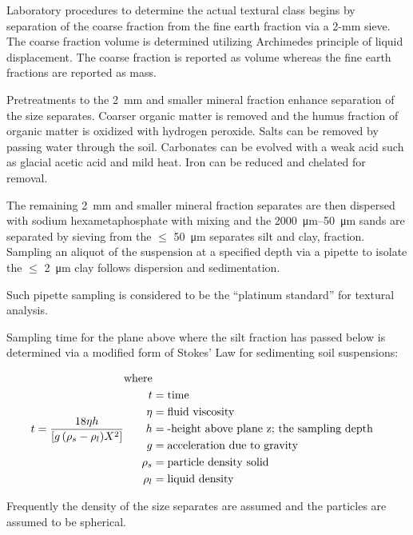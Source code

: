 \documentclass{article}
\begin{document}
Laboratory procedures to determine the actual textural class begins by separation of the coarse fraction from the fine earth fraction via a 2-mm sieve. The coarse fraction volume is determined utilizing Archimedes principle of liquid displacement. The coarse fraction is reported as volume whereas the fine earth fractions are reported as mass.

Pretreatments to the 2~mm and smaller mineral fraction enhance separation of the size separates. Coarser organic matter is removed and the humus fraction of organic matter is oxidized with hydrogen peroxide. Salts can be removed by passing water through the soil. Carbonates can be evolved with a weak acid such as glacial acetic acid and mild heat. Iron can be reduced and chelated for removal.

The remaining \qty{2}{mm} and smaller mineral fraction separates are then dispersed with sodium hexametaphosphate with mixing and the \qtyrange{2000}{50}{\micro\metre} sands are separated by sieving from the $\leq$ \qty{50}{\micro\metre} separates silt and clay, fraction. Sampling an aliquot of the suspension at a specified depth via a pipette to isolate the $\leq$ \qty{2}{\micro\metre} clay follows dispersion and sedimentation.

Such pipette sampling is considered to be the “platinum standard” for textural analysis.

Sampling time for the plane above where the silt fraction has passed below is determined via a modified form of Stokes’ Law for sedimenting soil suspensions:

\begin{equation}
    t=\frac{18\eta h} {[g\,(\rho_s - \rho_l)X^2]} \\
    \begin{aligned}
        \text{where} \\
        t &= \text{time} \\
        \eta &= \text{fluid viscosity} \\
        h &= \text{-height above plane z; the sampling depth} \\
        g &= \text{acceleration due to gravity} \\
        \rho_s &= \text{particle density solid} \\
        \rho_l &= \text{liquid density} \\
    \end{aligned}
\end{equation}
        
Frequently the density of the size separates are assumed and the particles are assumed to be spherical.
\end{document}
